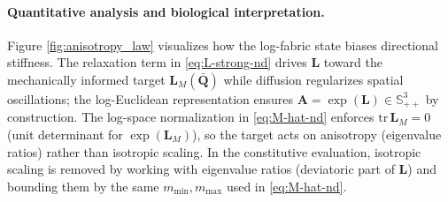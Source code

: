 \paragraph{Quantitative analysis and biological interpretation.}
Figure \ref{fig:anisotropy_law} visualizes how the log-fabric state biases directional stiffness. The relaxation term in \eqref{eq:L-strong-nd} drives $\mathbf{L}$ toward the mechanically informed target $\mathbf{L}_M(\bar{\mathbf{Q}})$ while diffusion regularizes spatial oscillations; the log-Euclidean representation ensures $\mathbf{A}=\exp(\mathbf{L})\in\mathbb{S}^{3}_{++}$ by construction. The log-space normalization in \eqref{eq:M-hat-nd} enforces $\mathrm{tr}\,\mathbf{L}_M=0$ (unit determinant for $\exp(\mathbf{L}_M)$), so the target acts on anisotropy (eigenvalue ratios) rather than isotropic scaling. In the constitutive evaluation, isotropic scaling is removed by working with eigenvalue ratios (deviatoric part of $\mathbf{L}$) and bounding them by the same $m_{\min},m_{\max}$ used in \eqref{eq:M-hat-nd}.
